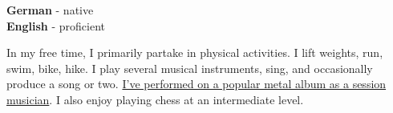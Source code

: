 \documentclass[9pt]{developercv} %
\begin{document}

\begin{minipage}[t]{0.3\textwidth}
	\vspace{-\baselineskip} %

	
	\textbf{German} - native\\
	\textbf{English} - proficient\\
\end{minipage}
\hfill
\begin{minipage}[t]{0.5\textwidth}
	\vspace{-\baselineskip} %
	
	
	In my free time, I primarily partake in physical activities. I lift weights, run, swim, bike, hike. I play several musical instruments, sing, and occasionally produce a song or two. \href{https://en.wikipedia.org/wiki/No_Grave_But_the_Sea}{I've performed on a popular metal album as a session musician}.
    I also enjoy playing chess at an intermediate level.
\end{minipage}
\hfill

\end{document}
